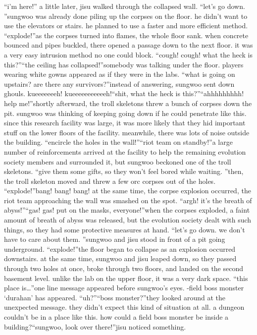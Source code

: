 “i’m here!” a little later, jisu walked through the collapsed wall.
“let’s go down.
”sungwoo was already done piling up the corpses on the floor.
 he didn’t want to use the elevators or stairs.
 he planned to use a faster and more efficient method.
“explode!”as the corpses turned into flames, the whole floor sank.
 when concrete bounced and pipes buckled, there opened a passage down to the next floor.
it was a very easy intrusion method no one could block.
“cough! cough! what the heck is this?”“the ceiling has collapsed!”somebody was talking under the floor.
 players wearing white gowns appeared as if they were in the labs.
“what is going on upstairs? are there any survivors?”instead of answering, sungwoo sent down ghouls.
kueeeeeeeh! kueeeeeeeeeeeh!“shit, what the heck is this?”“ahhhhhhhhh! help me!”shortly afterward, the troll skeletons threw a bunch of corpses down the pit.
sungwoo was thinking of keeping going down if he could penetrate like this.
since this research facility was large, it was more likely that they hid important stuff on the lower floors of the facility.
meanwhile, there was lots of noise outside the building.
“encircle the holes in the wall!”“riot team on standby!”a large number of reinforcements arrived at the facility to help the remaining evolution society members and surrounded it, but sungwoo beckoned one of the troll skeletons.
“give them some gifts, so they won’t feel bored while waiting.
”then, the troll skeleton moved and threw a few orc corpses out of the holes.
“explode!”bang! bang! bang!
at the same time, the corpse explosion occurred, the riot team approaching the wall was smashed on the spot.
“argh! it’s the breath of abyss!”“gas! gas! put on the masks, everyone!”when the corpses exploded, a faint amount of breath of abyss was released, but the evolution society dealt with such things, so they had some protective measures at hand.
“let’s go down.
 we don’t have to care about them.
”sungwoo and jisu stood in front of a pit going underground.
“explode!”the floor began to collapse as an explosion occurred downstairs.
 at the same time, sungwoo and jisu leaped down, so they passed through two holes at once, broke through two floors, and landed on the second basement level.
unlike the lab on the upper floor, it was a very dark space.
“this place is…”one line message appeared before sungwoo’s eyes.
-field boss monster ‘durahan’ has appeared.
“uh?”“boss monster?”they looked around at the unexpected message.
 they didn’t expect this kind of situation at all.
a dungeon couldn’t be in a place like this.
 how could a field boss monster be inside a building?“sungwoo, look over there!”jisu noticed something.
